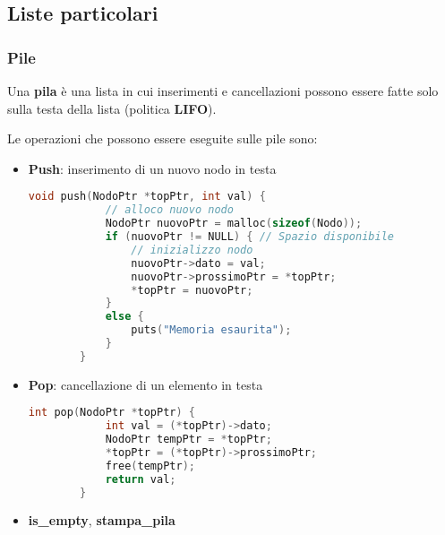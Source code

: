 \subsection{Liste particolari}
\subsubsection{Pile}
\begin{definition}
	Una \textbf{pila} è una lista in cui inserimenti e cancellazioni possono essere fatte solo sulla testa della lista (politica \textbf{LIFO}).
\end{definition}
Le operazioni che possono essere eseguite sulle pile sono:
\begin{itemize}
	\item \textbf{Push}: inserimento di un nuovo nodo in testa
	\begin{lstlisting}[language=C]
		void push(NodoPtr *topPtr, int val) {
			// alloco nuovo nodo
			NodoPtr nuovoPtr = malloc(sizeof(Nodo));
			if (nuovoPtr != NULL) { // Spazio disponibile
				// inizializzo nodo
				nuovoPtr->dato = val;
				nuovoPtr->prossimoPtr = *topPtr;
				*topPtr = nuovoPtr;
			}
			else {
				puts("Memoria esaurita");
			}
		}
	\end{lstlisting}
	\item  \textbf{Pop}: cancellazione di un elemento in testa
	\begin{lstlisting}[language=C]
		int pop(NodoPtr *topPtr) {
			int val = (*topPtr)->dato;
			NodoPtr tempPtr = *topPtr;
			*topPtr = (*topPtr)->prossimoPtr;
			free(tempPtr);
			return val;
		}
	\end{lstlisting}
	\item \textbf{is\_empty}, \textbf{stampa\_pila}
\end{itemize}

